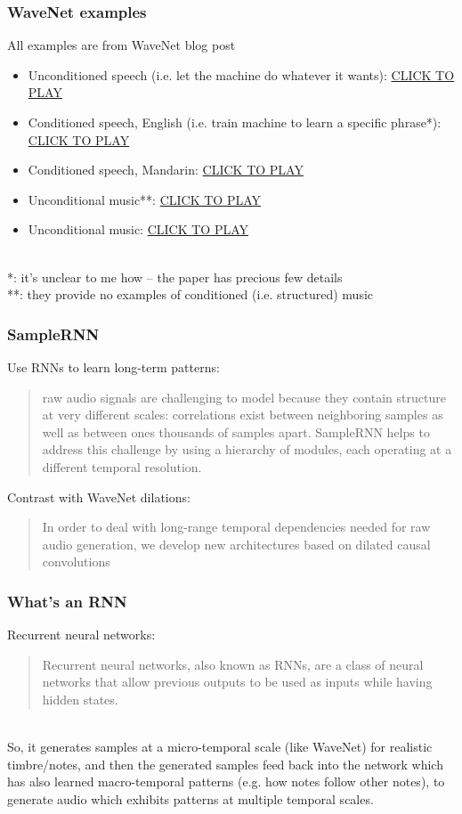 \documentclass{beamer}
\begin{document}
\begin{frame}
	\frametitle{WaveNet examples}
	All examples are from WaveNet blog post
	\begin{itemize}
		\item
			Unconditioned speech (i.e. let the machine do whatever it wants): \href{run:./wavenet_speech_unconditional.wav}{CLICK TO PLAY}
		\item
			Conditioned speech, English (i.e. train machine to learn a specific phrase*): \href{run:./wavenet_speech_conditioned_english.wav}{CLICK TO PLAY}
		\item
			Conditioned speech, Mandarin: \href{run:./wavenet_speech_conditioned_mandarin.wav}{CLICK TO PLAY}
		\item
			Unconditional music**: \href{run:./wavenet_sample_1.wav}{CLICK TO PLAY}
		\item
			Unconditional music: \href{run:./wavenet_sample_2.wav}{CLICK TO PLAY}
	\end{itemize}\ \\
	\vspace{1em}
	*: it's unclear to me how -- the paper has precious few details\\
	**: they provide no examples of conditioned (i.e. structured) music
\end{frame}

\begin{frame}
	\frametitle{SampleRNN}
	Use RNNs to learn long-term patterns:\\
	\begin{quote}
		raw audio signals are challenging to model because they contain structure at very different scales: correlations exist between neighboring samples as well as between ones thousands of samples apart. SampleRNN helps to address this challenge by using a hierarchy of modules, each operating at a different temporal resolution.
	\end{quote}
	Contrast with WaveNet dilations:
	\begin{quote}
		In order to deal with long-range temporal dependencies needed for raw audio generation, we develop new architectures based on dilated causal convolutions
	\end{quote}
\end{frame}

\begin{frame}
	\frametitle{What's an RNN}
	Recurrent neural networks:
	\begin{quote}
		Recurrent neural networks, also known as RNNs, are a class of neural networks that allow previous outputs to be used as inputs while having hidden states.
	\end{quote}\\
	So, it generates samples at a micro-temporal scale (like WaveNet) for realistic timbre/notes, and then the generated samples feed back into the network which has also learned macro-temporal patterns (e.g. how notes follow other notes), to generate audio which exhibits patterns at multiple temporal scales.\\
\end{frame}
\end{document}
